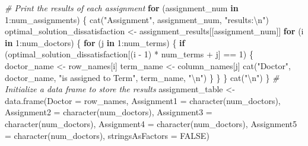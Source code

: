 \documentclass[
]{article}
\newenvironment{Shaded}{\begin{snugshade}}{\end{snugshade}}
\newcommand{\AttributeTok}[1]{\textcolor[rgb]{0.77,0.63,0.00}{#1}}
\newcommand{\CommentTok}[1]{\textcolor[rgb]{0.56,0.35,0.01}{\textit{#1}}}
\newcommand{\ConstantTok}[1]{\textcolor[rgb]{0.00,0.00,0.00}{#1}}
\newcommand{\ControlFlowTok}[1]{\textcolor[rgb]{0.13,0.29,0.53}{\textbf{#1}}}
\newcommand{\DecValTok}[1]{\textcolor[rgb]{0.00,0.00,0.81}{#1}}
\newcommand{\FunctionTok}[1]{\textcolor[rgb]{0.00,0.00,0.00}{#1}}
\newcommand{\NormalTok}[1]{#1}
\newcommand{\OtherTok}[1]{\textcolor[rgb]{0.56,0.35,0.01}{#1}}
\newcommand{\SpecialCharTok}[1]{\textcolor[rgb]{0.00,0.00,0.00}{#1}}
\newcommand{\StringTok}[1]{\textcolor[rgb]{0.31,0.60,0.02}{#1}}
\begin{document}
\begin{Shaded}
\begin{Highlighting}[]
\CommentTok{\# Print the results of each assignment}
\ControlFlowTok{for}\NormalTok{ (assignment\_num }\ControlFlowTok{in} \DecValTok{1}\SpecialCharTok{:}\NormalTok{num\_assignments) \{}
  \FunctionTok{cat}\NormalTok{(}\StringTok{"Assignment"}\NormalTok{, assignment\_num, }\StringTok{"results:}\SpecialCharTok{\textbackslash{}n}\StringTok{"}\NormalTok{)}
\NormalTok{  optimal\_solution\_dissatisfaction }\OtherTok{\textless{}{-}}\NormalTok{ assignment\_results[[assignment\_num]]}
  \ControlFlowTok{for}\NormalTok{ (i }\ControlFlowTok{in} \DecValTok{1}\SpecialCharTok{:}\NormalTok{num\_doctors) \{}
    \ControlFlowTok{for}\NormalTok{ (j }\ControlFlowTok{in} \DecValTok{1}\SpecialCharTok{:}\NormalTok{num\_terms) \{}
      \ControlFlowTok{if}\NormalTok{ (optimal\_solution\_dissatisfaction[(i }\SpecialCharTok{{-}} \DecValTok{1}\NormalTok{) }\SpecialCharTok{*}\NormalTok{ num\_terms }\SpecialCharTok{+}\NormalTok{ j] }\SpecialCharTok{==} \DecValTok{1}\NormalTok{) \{}
\NormalTok{        doctor\_name }\OtherTok{\textless{}{-}}\NormalTok{ row\_names[i]}
\NormalTok{        term\_name }\OtherTok{\textless{}{-}}\NormalTok{ column\_names[j]}
        \FunctionTok{cat}\NormalTok{(}\StringTok{"Doctor"}\NormalTok{, doctor\_name, }\StringTok{"is assigned to Term"}\NormalTok{, term\_name, }\StringTok{"}\SpecialCharTok{\textbackslash{}n}\StringTok{"}\NormalTok{)}
\NormalTok{      \}}
\NormalTok{    \}}
\NormalTok{  \}}
  \FunctionTok{cat}\NormalTok{(}\StringTok{"}\SpecialCharTok{\textbackslash{}n}\StringTok{"}\NormalTok{)}
\NormalTok{\}}
\CommentTok{\# Initialize a data frame to store the results}
\NormalTok{assignment\_table }\OtherTok{\textless{}{-}} \FunctionTok{data.frame}\NormalTok{(}\AttributeTok{Doctor =}\NormalTok{ row\_names, }
                               \AttributeTok{Assignment1 =} \FunctionTok{character}\NormalTok{(num\_doctors), }
                               \AttributeTok{Assignment2 =} \FunctionTok{character}\NormalTok{(num\_doctors),}
                               \AttributeTok{Assignment3 =} \FunctionTok{character}\NormalTok{(num\_doctors),}
                               \AttributeTok{Assignment4 =} \FunctionTok{character}\NormalTok{(num\_doctors),}
                               \AttributeTok{Assignment5 =} \FunctionTok{character}\NormalTok{(num\_doctors),}
                               \AttributeTok{stringsAsFactors =} \ConstantTok{FALSE}\NormalTok{)}


\end{Highlighting}
\end{Shaded}
\end{document}
